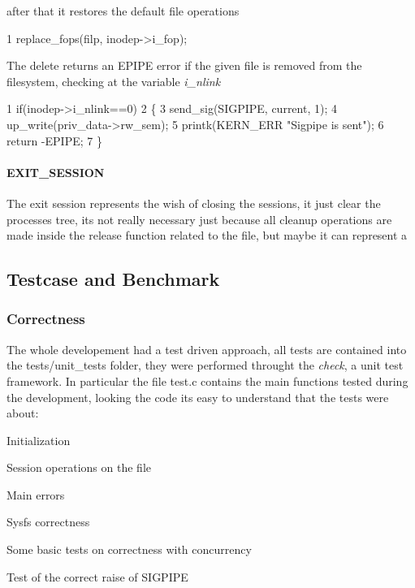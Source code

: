 after that it restores the default file operations 
\begin{DoxyCode}
1 replace\_fops(filp, inodep->i\_fop);
\end{DoxyCode}


The delete returns an E\+P\+I\+PE error if the given file is removed from the filesystem, checking at the variable {\itshape i\+\_\+nlink} 
\begin{DoxyCode}
1 if(inodep->i\_nlink==0)
2 \{
3     send\_sig(SIGPIPE, current, 1);
4     up\_write(priv\_data->rw\_sem);
5     printk(KERN\_ERR "Sigpipe is sent");
6     return -EPIPE;
7 \}
\end{DoxyCode}
 \paragraph*{E\+X\+I\+T\+\_\+\+S\+E\+S\+S\+I\+ON}

The exit session represents the wish of closing the sessions, it just clear the processes tree, it\textquotesingle{}s not really necessary just because all cleanup operations are made inside the release function related to the file, but maybe it can represent a

\subsection*{Testcase and Benchmark}

\subsubsection*{Correctness}

The whole developement had a test driven approach, all tests are contained into the tests/unit\+\_\+tests folder, they were performed throught the {\itshape check}, a unit test framework. In particular the file test.\+c contains the main functions tested during the development, looking the code it\textquotesingle{}s easy to understand that the tests were about\+:
\begin{DoxyItemize}
\item Initialization
\item Session operations on the file
\item Main errors
\item Sysfs correctness
\item Some basic tests on correctness with concurrency
\item Test of the correct raise of S\+I\+G\+P\+I\+PE
\end{DoxyItemize}


